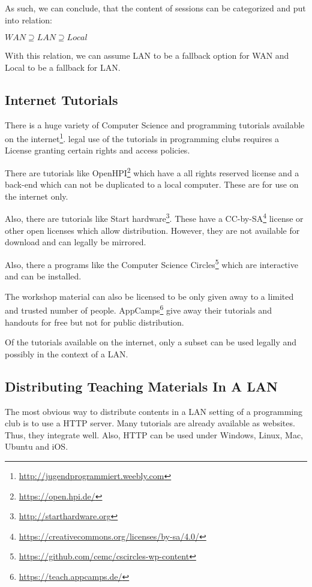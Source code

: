 As such, we can conclude, that the content of sessions can be categorized and put into relation:

$WAN \supseteq LAN \supseteq Local$

With this relation, we can assume LAN to be a fallback option for WAN and Local to be a fallback for LAN.

\subsection{Internet Tutorials}

There is a huge variety of Computer Science and programming tutorials available on the internet\footnote{\url{http://jugendprogrammiert.weebly.com}}.
legal use of the tutorials in programming clubs requires a License granting certain rights and access policies.

There are tutorials like OpenHPI\footnote{\url{https://open.hpi.de/}} which have a all rights reserved license and a back-end which can not be duplicated to a local computer. These are for use on the internet only.

Also, there are tutorials like Start hardware\footnote{\url{http://starthardware.org}}.
These have a CC-by-SA\footnote{\url{https://creativecommons.org/licenses/by-sa/4.0/}} license or other open licenses which allow distribution.
However, they are not available for download and can legally be mirrored.

Also, there a programs like the Computer Science Circles\footnote{\url{https://github.com/cemc/cscircles-wp-content}} which are interactive and can be installed.

The workshop material can also be licensed to be only given away to a limited and trusted number of people. AppCamps\footnote{\url{https://teach.appcamps.de/}} give away their tutorials and handouts for free but not for public distribution.

Of the tutorials available on the internet, only a subset can be used legally and possibly in the context of a LAN.

\subsection{Distributing Teaching Materials In A LAN}

The most obvious way to distribute contents in a LAN setting of a programming club is to use a HTTP server.
Many tutorials are already available as websites.
Thus, they integrate well.
Also, HTTP can be used under Windows, Linux, Mac, Ubuntu and iOS.

